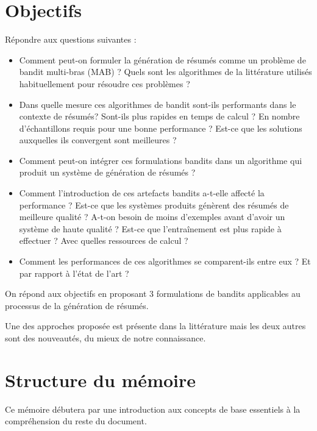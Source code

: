 \section*{Objectifs}


Répondre aux questions suivantes :

\begin{itemize}
    \item Comment peut-on formuler la génération de résumés comme un problème de bandit multi-bras (MAB) ?
          Quels sont les algorithmes de la littérature utilisés habituellement pour résoudre ces problèmes ?
    \item Dans quelle mesure ces algorithmes de bandit sont-ils performants dans le contexte de résumés?
          Sont-ils plus rapides en temps de calcul ? En nombre d'échantillons requis pour une
          bonne performance ? Est-ce que les solutions auxquelles ils convergent sont meilleures ?
    \item Comment peut-on intégrer ces formulations bandits dans un algorithme qui produit
          un système de génération de résumés ?
    \item Comment l'introduction de ces artefacts bandits a-t-elle affecté la performance ?
          Est-ce que les systèmes produits génèrent des résumés de meilleure qualité ?
          A-t-on besoin de moins d'exemples avant d'avoir un système de haute qualité ?
          Est-ce que l'entraînement est plus rapide à effectuer ? Avec quelles ressources de calcul ?
    \item Comment les performances de ces algorithmes se comparent-ils entre eux ? Et par rapport à l'état de l'art ?
\end{itemize}

On répond aux objectifs en proposant 3 formulations de bandits applicables au processus
de la génération de résumés.

Une des approches proposée est présente dans la littérature mais les deux autres sont
des nouveautés, du mieux de notre connaissance.

\section*{Structure du mémoire}

Ce mémoire débutera par une introduction aux concepts de base essentiels à la compréhension
du reste du document.

